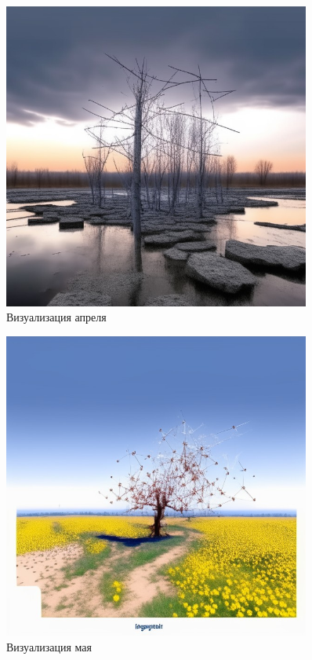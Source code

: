 \begin{figure}[H]
	\caption{Визуализация апреля}
	\includegraphics[width=0.9\textwidth]{img/apr.jpeg}
\end{figure}

\begin{figure}[H]
	\caption{Визуализация мая}
	\includegraphics[width=0.9\textwidth]{img/may.jpeg}
\end{figure}

